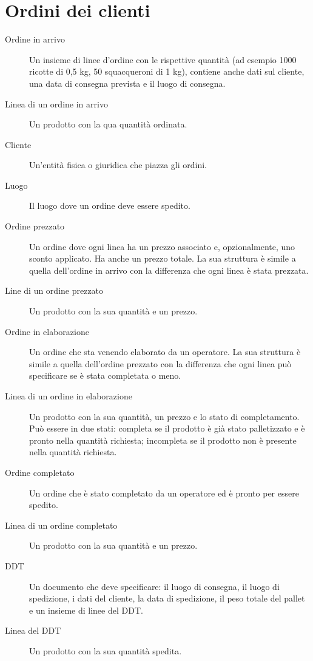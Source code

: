 \section{Ordini dei clienti}
\begin{description}
    \item[Ordine in arrivo]
    Un insieme di linee d'ordine con le rispettive quantità (ad esempio 1000 ricotte di 0,5 kg, 50 squacqueroni di 1 kg), contiene anche dati sul cliente, una data di consegna prevista e il luogo di consegna.
    \item[Linea di un ordine in arrivo] Un prodotto con la qua quantità ordinata.
    \item[Cliente] Un'entità fisica o giuridica che piazza gli ordini.
    \item[Luogo] Il luogo dove un ordine deve essere spedito.
    \item[Ordine prezzato] Un ordine dove ogni linea ha un prezzo associato e, opzionalmente, uno sconto applicato. Ha anche un prezzo totale. La sua struttura è simile a quella dell'ordine in arrivo con la differenza che ogni linea è stata prezzata.
    \item[Line di un ordine prezzato] Un prodotto con la sua quantità e un prezzo.
    \item[Ordine in elaborazione] Un ordine che sta venendo elaborato da un operatore. La sua struttura è simile a quella dell'ordine prezzato con la differenza che ogni linea può specificare se è stata completata o meno.
    \item[Linea di un ordine in elaborazione] Un prodotto con la sua quantità, un prezzo e lo stato di completamento. Può essere in due stati: completa se il prodotto è già stato palletizzato e è pronto nella quantità richiesta; incompleta se il prodotto non è presente nella quantità richiesta.
    \item[Ordine completato] Un ordine che è stato completato da un operatore ed è pronto per essere spedito.
    \item[Linea di un ordine completato] Un prodotto con la sua quantità e un prezzo.
    \item[DDT] Un documento che deve specificare: il luogo di consegna, il luogo di spedizione, i dati del cliente, la data di spedizione, il peso totale del pallet e un insieme di linee del DDT.
    \item[Linea del DDT] Un prodotto con la sua quantità spedita.
\end{description}

